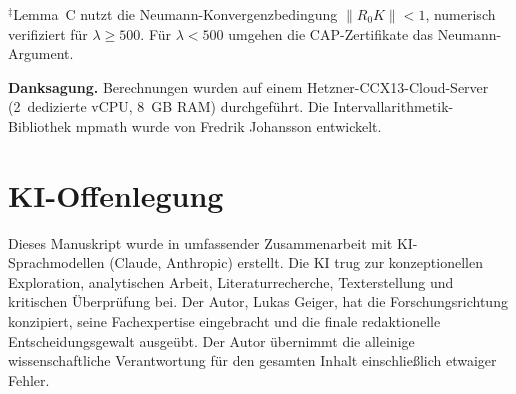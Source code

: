 \documentclass[12pt,a4paper]{article}
\theoremstyle{definition}
\theoremstyle{remark}
\begin{document}
\noindent${}^\ddagger$Lemma~C nutzt die Neumann-Konvergenzbedingung $\|R_0 K\| < 1$, numerisch verifiziert für $\lambda \geq 500$. Für $\lambda < 500$ umgehen die CAP-Zertifikate das Neumann-Argument.

\bigskip
\noindent\textbf{Danksagung.} Berechnungen wurden auf einem Hetzner-CCX13-Cloud-Server (2~dedizierte vCPU, 8~GB RAM) durchgeführt. Die Intervallarithmetik-Bibliothek mpmath wurde von Fredrik Johansson entwickelt.


\section*{KI-Offenlegung}

Dieses Manuskript wurde in umfassender Zusammenarbeit mit KI-Sprachmodellen (Claude, Anthropic) erstellt. Die KI trug zur konzeptionellen Exploration, analytischen Arbeit, Literaturrecherche, Texterstellung und kritischen Überprüfung bei. Der Autor, Lukas Geiger, hat die Forschungsrichtung konzipiert, seine Fachexpertise eingebracht und die finale redaktionelle Entscheidungsgewalt ausgeübt. Der Autor übernimmt die alleinige wissenschaftliche Verantwortung für den gesamten Inhalt einschließlich etwaiger Fehler.
\end{document}
